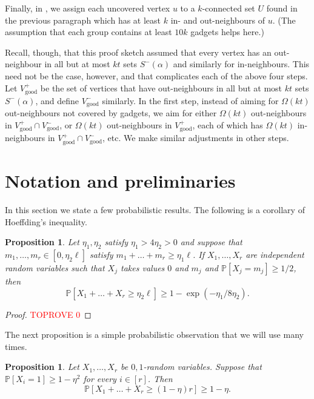 \documentclass[english]{article}
\theoremstyle{plain}
\newtheorem{proposition}[theorem]{Proposition}
\theoremstyle{remark}
\def \Sm {S^-}
\def \Vgp {V_{\good}^+}
\def \Vgp {V_{\good}^+}
\def \Vgm {V_{\good}^-}
\def \Vgm {V_{\good}^-}
\renewcommand{\Pr}{\mathbb{P}}
\DeclareMathOperator{\good}{good}
\begin{document}
	Finally, in , we assign each uncovered vertex $u$ to a $k$-connected set $U$ found in the previous paragraph which has at least $k$ in- and out-neighbours of $u$. 
	(The assumption that each group contains at least $10k$ gadgets helps here.)

	Recall, though, that this proof sketch assumed that every vertex has an out-neighbour in all but at most $kt$ sets $\Sm(\alpha)$ and similarly for in-neighbours. This need not be the case, however, and that complicates each of the above four steps. Let $\Vgp$ be the set of vertices that have out-neighbours in all but at most $kt$ sets $\Sm(\alpha)$, and define $\Vgm$ similarly. In the first step, instead of aiming for $\Omega(kt)$ out-neighbours not covered by gadgets, we aim for either $\Omega(kt)$ out-neighbours in $\Vgp \cap \Vgm$, or $\Omega(kt)$ out-neighbours in $\Vgp$, each of which has $\Omega(kt)$ in-neighbours in $\Vgp \cap \Vgm$, etc. We make similar adjustments in other steps.
	

\section{Notation and preliminaries} \label{sec:prelims}
	In this section we state a few probabilistic results. The following is a corollary of Hoeffding's inequality. 

	\begin{proposition} \label{prop:hoeffding}
		Let $\eta_1, \eta_2$ satisfy $\eta_1 > 4\eta_2 > 0$ and suppose that $m_1, \ldots, m_r \in [0, \eta_2 \ell]$ satisfy $m_1 + \ldots + m_r \ge \eta_1 \ell$. If $X_1, \ldots, X_r$ are independent random variables such that $X_j$ takes values $0$ and $m_j$ and $\Pr[X_j = m_j] \ge 1/2$, then
		\begin{equation} \label{eqn:hoeffding}
			\Pr[X_1 + \ldots + X_r \ge \eta_2 \ell] \ge 1 - \exp(-\eta_1/8\eta_2).
		\end{equation}
	\end{proposition}

	\begin{proof}\textcolor{red}{TOPROVE 0}\end{proof}

	The next proposition is a simple probabilistic observation that we will use many times.

	\begin{proposition} \label{prop:markov}
		Let $X_1, \ldots, X_r$ be $0,1$-random variables. Suppose that $\Pr[X_i = 1] \ge 1 - \eta^2$ for every $i \in [r]$. Then 
		\begin{equation*}
			\Pr[X_1 + \ldots + X_r \ge (1 - \eta)r] \ge 1 - \eta.
		\end{equation*}
	\end{proposition}
\end{document}
